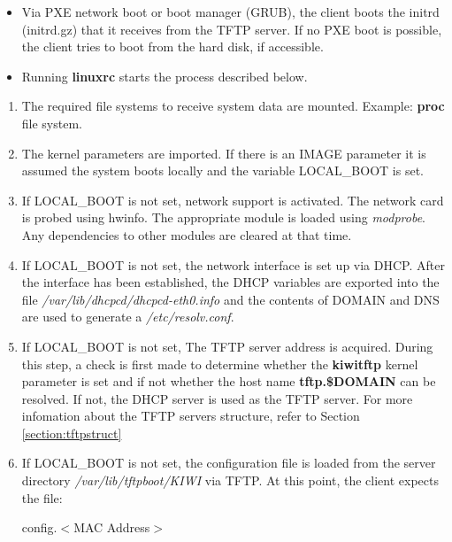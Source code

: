 \begin{itemize}
\item Via PXE network boot or boot manager (GRUB), the client boots the
      initrd (initrd.gz) that it receives from the TFTP server. If no PXE
      boot is possible, the client tries to boot from the hard
      disk, if accessible.
\item Running \textbf{linuxrc} starts the process described below.
\end{itemize}

\begin{enumerate}
	\item The required file systems to receive system data are mounted.
          Example: \textbf{proc} file system.
	\item The kernel parameters are imported. If there is an IMAGE
          parameter it is assumed the system boots locally and the
          variable LOCAL\_BOOT is set.
	\item If LOCAL\_BOOT is not set, network support is activated.
		  The network card is probed using hwinfo. The appropriate module
          is loaded using \textit{modprobe}. Any dependencies to other
          modules are cleared at that time.
	\item If LOCAL\_BOOT is not set, the network interface is set up
          via DHCP. After the interface has
          been established, the DHCP variables are exported into the file
          \textit{/var/lib/dhcpcd/dhcpcd-eth0.info} and the contents of
          DOMAIN and DNS are used to generate a \textit{/etc/resolv.conf}.
	\item If LOCAL\_BOOT is not set, The TFTP server address is
          acquired. During this step, a check
          is first made to determine whether the \textbf{kiwitftp} kernel
          parameter is set and if not whether the host name
          \textbf{tftp.\$DOMAIN} can be resolved. If not, the DHCP
          server is used as the TFTP server. For more infomation about the
          TFTP servers structure, refer to Section \ref{section:tftpstruct}
	\item If LOCAL\_BOOT is not set, the configuration file is loaded from
          the server directory
          \textit{/var/lib/tftpboot/KIWI} via TFTP. At this point, the client
          expects the file:

          \begin{Command}{8cm}
          config.$<$MAC Address$>$
          \end{Command}


\end{enumerate}
